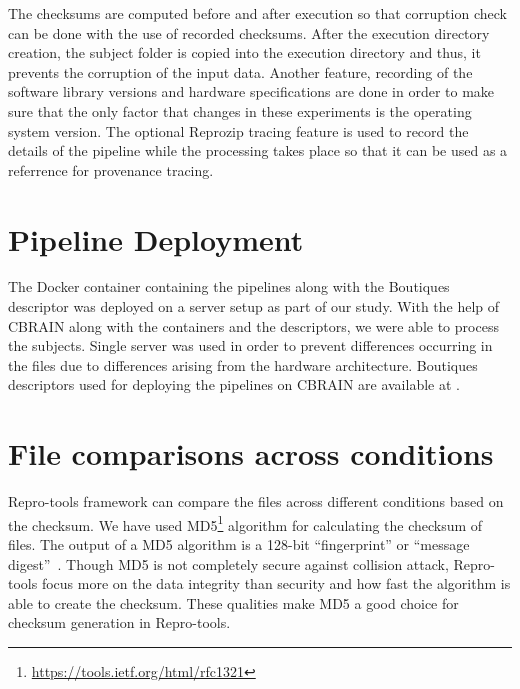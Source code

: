 The checksums are computed before and after execution so that corruption check can be done with the use of recorded checksums. After the execution directory creation, the subject folder is copied into the execution directory and thus, it prevents the corruption of the input data. Another feature, recording of the software library versions and hardware specifications are done in order to make sure that the only factor that changes in these experiments is the operating system version. The optional Reprozip tracing feature is used to record the details of the pipeline while the processing takes place so that it can be used as a referrence for provenance tracing.

\section{Pipeline Deployment}
The Docker container containing the pipelines along with the Boutiques descriptor was deployed on a server setup as part of our study. With the help of CBRAIN along with the containers and the descriptors, we were able to process the subjects. Single server was used in order to prevent differences occurring in the files due to differences arising from the hardware architecture. Boutiques descriptors used for deploying the pipelines on CBRAIN are available at \cite{HCP_descriptors}.


\section{File comparisons across conditions}
Repro-tools framework can compare the files across different conditions based on the checksum. We have used MD5\footnote{\url{https://tools.ietf.org/html/rfc1321}} algorithm for calculating the checksum of files. The output of a MD5 algorithm is a 128-bit ``fingerprint'' or ``message digest''~\cite{md5}. Though MD5 is not completely secure against collision attack, Repro-tools focus more on the data integrity than security and how fast the algorithm is able to create the checksum. These qualities make MD5 a good choice for checksum generation in Repro-tools.

